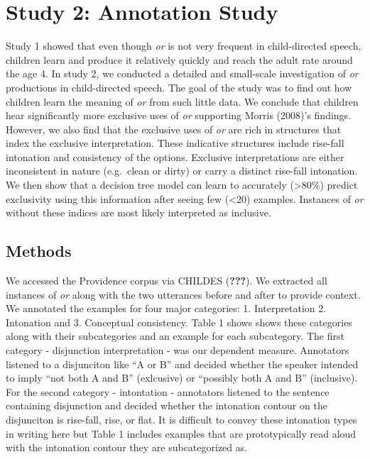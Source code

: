 \documentclass[10pt, letterpaper]{article}
\begin{document}
\section{Study 2: Annotation Study}\label{study-2-annotation-study}

Study 1 showed that even though \emph{or} is not very frequent in
child-directed speech, children learn and produce it relatively quickly
and reach the adult rate around the age 4. In study 2, we conducted a
detailed and small-scale investigation of \emph{or} productions in
child-directed speech. The goal of the study was to find out how
children learn the meaning of \emph{or} from such little data. We
conclude that children hear significantly more exclusive uses of
\emph{or} supporting Morris (2008)'s findings. However, we also find
that the exclusive uses of \emph{or} are rich in structures that index
the exclusive interpretation. These indicative structures include
rise-fall intonation and consistency of the options. Exclusive
interpretations are either inconsistent in nature (e.g.~clean or dirty)
or carry a distinct rise-fall intonation. We then show that a decision
tree model can learn to accurately (\textgreater{}80\%) predict
exclusivity using this information after seeing few (\textless{}20)
examples. Instances of \emph{or} without these indices are most likely
interpreted as inclusive.

\subsection{Methods}\label{methods-1}

We accessed the Providence corpus via CHILDES ({\textbf{???}}). We
extracted all instances of \emph{or} along with the two utterances
before and after to provide context. We annotated the examples for four
major categories: 1. Interpretation 2. Intonation and 3. Conceptual
consistency. Table 1 shows shows these categories along with their
subcategories and an example for each subcategory. The first category -
disjunction interpretation - was our dependent measure. Annotators
listened to a disjunciton like ``A or B'' and decided whether the
speaker intended to imply ``not both A and B'' (exlcusive) or ``possibly
both A and B'' (inclusive). For the second category - intontation -
annotators listened to the sentence containing disjunction and decided
whether the intonation contour on the disjunciton is rise-fall, rise, or
flat. It is difficult to convey these intonation types in writing here
but Table 1 includes examples that are prototypically read aloud with
the intonation contour they are subcategorized as.
\end{document}
